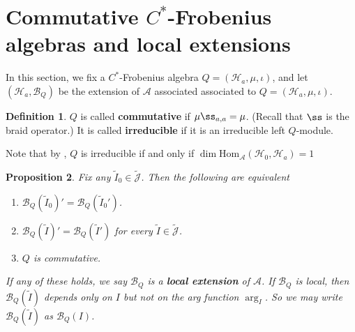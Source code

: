 \documentclass[12pt,a4paper,notitlepage]{article}
\theoremstyle{definition}
\newtheorem{df}{Definition}[section]
\theoremstyle{plain}
\newtheorem{pp}[df]{Proposition}
\newcommand{\mc}{\mathcal}
\newcommand{\wtd}{\widetilde}
\newcommand{\Hom}{\mathrm{Hom}}
\newcommand{\Jtd}{\widetilde{\mathcal J}}
\numberwithin{equation}{section}
\begin{document}
\section{Commutative $C^*$-Frobenius algebras and local extensions}\label{lb19}

In this section, we fix a $C^*$-Frobenius algebra $Q=(\mc H_a,\mu,\iota)$, and let $(\mc H_a,\mc B_Q)$ be the extension of $\mc A$ associated associated to $Q=(\mc H_a,\mu,\iota)$.

\begin{df}
$Q$ is called \textbf{commutative} if $\mu\ss_{a,a}=\mu$. (Recall that $\ss$ is the braid operator.) It is called \textbf{irreducible} if it is an irreducible left $Q$-module.
\end{df}

Note that by \cite[Rem. 2.7]{NY18}, $Q$ is irreducible if and only if $\dim\Hom_{\mc A}(\mc H_0,\mc H_a)=1$





\begin{pp}\label{lb21}
Fix any $\wtd I_0\in\Jtd$. Then the following are equivalent
\begin{enumerate}[label=(\arabic*)]
\item $\mc B_Q(\wtd I_0)'=\mc B_Q(\wtd I_0')$.
\item $\mc B_Q(\wtd I)'=\mc B_Q(\wtd I')$ for every $\wtd I\in\Jtd$.
\item $Q$ is commutative. 
\end{enumerate}
If any of these holds, we say $\mc B_Q$ is a \textbf{local extension} of $\mc A$. If $\mc B_Q$ is local, then $\mc B_Q(\wtd I)$ depends only on $I$ but not on the arg function $\arg_I$. So we may write $\mc B_Q(\wtd I)$ as $\mc B_Q(I)$.
\end{pp}
\end{document}

